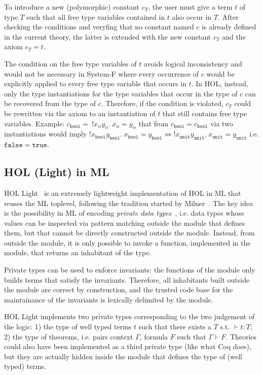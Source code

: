 \documentclass[preprint]{sigplanconf}
\begin{document}
To introduce a new (polymorphic) constant $c_T$, the user must give a term $t$
of type $T$ such that all free type variables contained in $t$ also occur in
$T$. After checking the conditions and veryfing that no constant named $c$ is already defined in the current theory, the latter is extended with the new
constant $c_T$ and the axiom $c_T = t$.

The condition on the free type variables of $t$ avoids logical inconsistency
and would not be necessary in System-F where every occurrence of $c$ would be explicitly applied to every free type variable that occurs in $t$. In HOL, instead, only the type instantiations for the type variables that occur in the type of $c$ can be recovered from the type of $c$. Therefore, if the condition is violated, $c_T$ could be rewritten via the axiom to an instantiation of $t$ that still contains free type variables. Example: $c_\mathtt{bool} = \ ! x_\alpha y_\alpha. \  x_\alpha = y_\alpha$ that from $c_\mathtt{bool} = c_\mathtt{bool}$ via two instantiations would imply $! x_\mathtt{bool} y_\mathtt{bool}. \  x_\mathtt{bool}= y_\mathtt{bool} \iff ! x_\mathtt{unit} y_\mathtt{unit}. \  x_\mathtt{unit}= y_\mathtt{unit}$ i.e. $\mathtt{false} = \mathtt{true}$.

\subsection{HOL (Light) in ML}
HOL Light~\cite{hol1} is an extremely lightweight implementation of HOL in ML that reuses the ML toplevel, following the tradition started by Milner~\cite{milner1}. The key idea is the possibility in ML of encoding \emph{private data types}~\cite{leroy1}, i.e. data types whose values can be inspected via pattern matching outside the module that defines them, but that cannot be directly constructed outside the module. Instead, from outside the module, it is only possible to invoke a function, implemented in the module, that returns an inhabitant of the type.

Private types can be used to enforce invariants: the functions of the module only builds terms that satisfy the invariants. Therefore, all inhabitants built outside the module are correct by construction, and the trusted code base for the maintainance of the invariants is lexically delimited by the module.

HOL Light implements two private types corresponding to the two judgement of the logic: 1) the type of well typed terms $t$ such that there exists a $T$ s.t. $\vdash t : T$; 2) the type of theorems, i.e. pairs context $\Gamma$, formula $F$ such that $\Gamma \vdash F$. Theories could also have been implemented as a third private type (like what Coq does), but they are actually hidden inside the module that defines the type of (well typed) terms.
\end{document}
